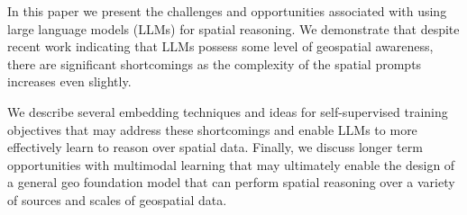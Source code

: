 
In this paper we present the challenges and opportunities associated with using large language models (LLMs) for spatial reasoning.
We demonstrate that despite recent work indicating that LLMs possess some level of geospatial awareness, there are significant shortcomings as the complexity of the spatial prompts increases even slightly.


We describe several embedding techniques and ideas for self-supervised training objectives that may address these shortcomings and enable LLMs to more effectively learn to reason over spatial data.
Finally, we discuss longer term opportunities with multimodal learning that may ultimately enable the design of a general geo foundation model that can perform spatial reasoning over a variety of sources and scales of geospatial data.


